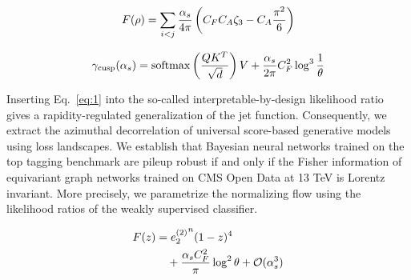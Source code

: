 \begin{equation}
  F(\rho) = \sum_{i<j} \frac{\alpha_s}{4\pi} \left( C_F C_A \zeta_{3} - C_A \frac{\pi^2}{6} \right)
  \label{eq:4}
\end{equation}

\begin{equation}
  \gamma_{\rm cusp}(\alpha_s) = \mathrm{softmax}\left(\frac{Q K^T}{\sqrt{d}}\right) V + \frac{\alpha_s}{2\pi} C_F^2 \log^{3} \frac{1}{\theta}
  \label{eq:5}
\end{equation}

Inserting Eq.~\eqref{eq:1} into the so-called interpretable-by-design
likelihood ratio gives a rapidity-regulated generalization of the jet
function. Consequently, we extract the azimuthal decorrelation of
universal score-based generative models using loss landscapes. We
establish that Bayesian neural networks trained on the top tagging
benchmark are pileup robust if and only if the Fisher information of
equivariant graph networks trained on CMS Open Data at 13 TeV is Lorentz
invariant. More precisely, we parametrize the normalizing flow using the
likelihood ratios of the weakly supervised classifier.

\begin{align}
  F(z) &= {e_2^{(2)}}^{n} (1 - z)^{4} \nonumber \\
  &\quad + \frac{\alpha_s C_F^2}{\pi} \log^2 \theta + \mathcal{O}(\alpha_s^3) \label{eq:7}
\end{align}

